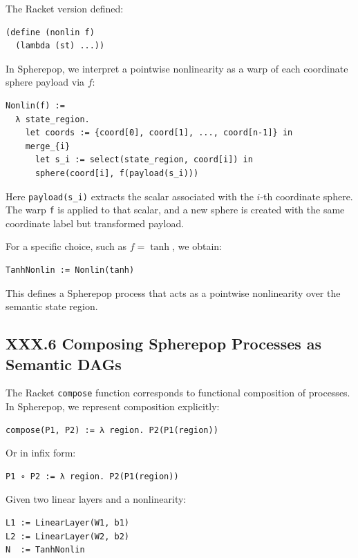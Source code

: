 \documentclass[11pt,letterpaper]{article}
\begin{document}
The Racket version defined:

\begin{verbatim}
(define (nonlin f)
  (lambda (st) ...))
\end{verbatim}

In Spherepop, we interpret a pointwise nonlinearity as a warp of each coordinate sphere payload via $f$:

\begin{verbatim}
Nonlin(f) :=
  λ state_region.
    let coords := {coord[0], coord[1], ..., coord[n-1]} in
    merge_{i}
      let s_i := select(state_region, coord[i]) in
      sphere(coord[i], f(payload(s_i)))
\end{verbatim}

Here \verb|payload(s_i)| extracts the scalar associated with the $i$-th coordinate sphere. The warp \verb|f| is applied to that scalar, and a new sphere is created with the same coordinate label but transformed payload.

For a specific choice, such as $f = \tanh$, we obtain:

\begin{verbatim}
TanhNonlin := Nonlin(tanh)
\end{verbatim}

This defines a Spherepop process that acts as a pointwise nonlinearity over the semantic state region.

\subsection{XXX.6 Composing Spherepop Processes as Semantic DAGs}

The Racket \verb|compose| function corresponds to functional composition of processes. In Spherepop, we represent composition explicitly:

\begin{verbatim}
compose(P1, P2) := λ region. P2(P1(region))
\end{verbatim}

Or in infix form:

\begin{verbatim}
P1 ∘ P2 := λ region. P2(P1(region))
\end{verbatim}

Given two linear layers and a nonlinearity:

\begin{verbatim}
L1 := LinearLayer(W1, b1)
L2 := LinearLayer(W2, b2)
N  := TanhNonlin
\end{verbatim}
\end{document}
